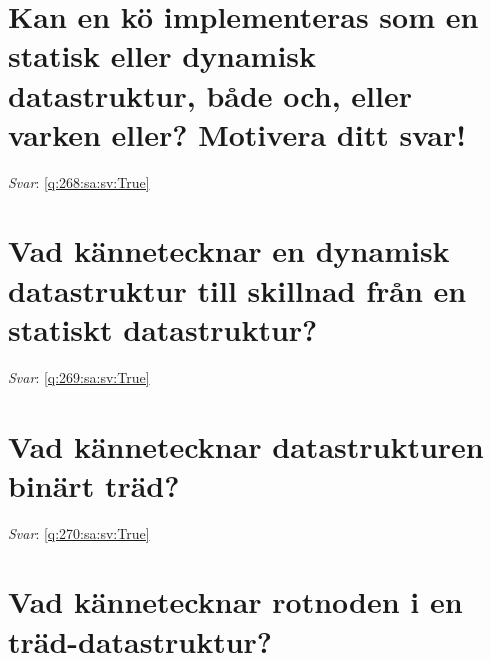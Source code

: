 \documentclass[a4paper,11pt,oneside]{book}
\begin{document}
\begin{sloppypar}
\section{Kan en k\"o implementeras som en statisk eller dynamisk datastruktur, b\r{a}de och, eller varken eller? Motivera ditt svar!}

\label{q:268:sa:sv:False}

\vspace{2cm}

\noindent\makebox[\textwidth]{\hrulefill}

\vspace{1cm}

\textit{Svar}: \autoref{q:268:sa:sv:True}



\section{Vad k\"annetecknar en dynamisk datastruktur till skillnad fr\r{a}n en statiskt datastruktur?}

\label{q:269:sa:sv:False}

\vspace{2cm}

\noindent\makebox[\textwidth]{\hrulefill}

\vspace{1cm}

\textit{Svar}: \autoref{q:269:sa:sv:True}



\section{Vad k\"annetecknar datastrukturen bin\"art tr\"ad?}

\label{q:270:sa:sv:False}

\vspace{2cm}

\noindent\makebox[\textwidth]{\hrulefill}

\vspace{1cm}

\textit{Svar}: \autoref{q:270:sa:sv:True}



\section{Vad k\"annetecknar rotnoden i en tr\"ad-datastruktur?}

\label{q:271:sa:sv:False}


\end{sloppypar}
\end{document}
